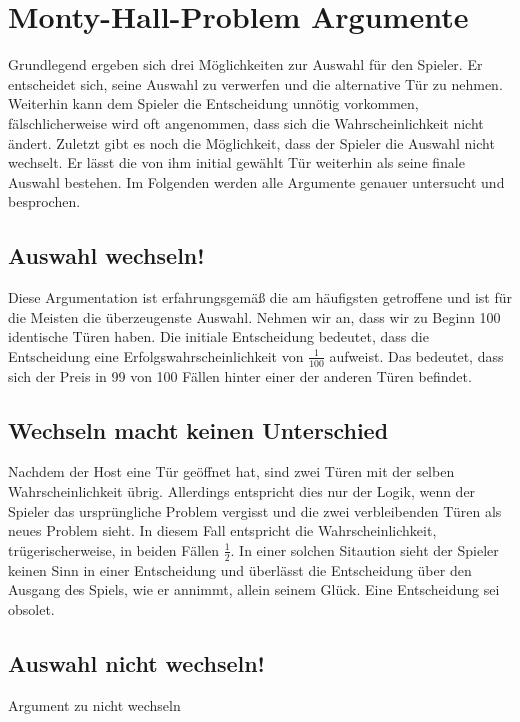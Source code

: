\chapter{Monty-Hall-Problem Argumente}

Grundlegend ergeben sich drei Möglichkeiten zur Auswahl für den Spieler. Er entscheidet sich, seine Auswahl zu verwerfen und die alternative Tür zu nehmen.
Weiterhin kann dem Spieler die Entscheidung unnötig vorkommen, fälschlicherweise wird oft angenommen, dass sich die Wahrscheinlichkeit nicht ändert. Zuletzt gibt es 
noch die Möglichkeit, dass der Spieler die Auswahl nicht wechselt. Er lässt die von ihm initial gewählt Tür weiterhin als seine finale Auswahl bestehen.
Im Folgenden werden alle Argumente genauer untersucht und besprochen.

    \section{Auswahl wechseln!}
    Diese Argumentation ist erfahrungsgemäß die am häufigsten getroffene und ist für die Meisten die überzeugenste Auswahl. Nehmen wir an, dass wir zu Beginn
    100 identische Türen haben. Die initiale Entscheidung bedeutet, dass die Entscheidung eine Erfolgswahrscheinlichkeit von $\frac{1}{100}$ aufweist. Das bedeutet, 
    dass sich der Preis in 99 von 100 Fällen hinter einer der anderen Türen befindet.

    \section{Wechseln macht keinen Unterschied}
    Nachdem der Host eine Tür geöffnet hat, sind zwei Türen mit der selben Wahrscheinlichkeit übrig. Allerdings entspricht dies nur der Logik, wenn der Spieler das 
    ursprüngliche Problem vergisst und die zwei verbleibenden Türen als neues Problem sieht. In diesem Fall entspricht die Wahrscheinlichkeit, trügerischerweise, in
    beiden Fällen $\frac{1}{2}$. In einer solchen Sitaution sieht der Spieler keinen Sinn in einer Entscheidung und überlässt die Entscheidung über den Ausgang 
    des Spiels, wie er annimmt, allein seinem Glück. Eine Entscheidung sei obsolet.


    \section{Auswahl nicht wechseln!}
    Argument zu nicht wechseln